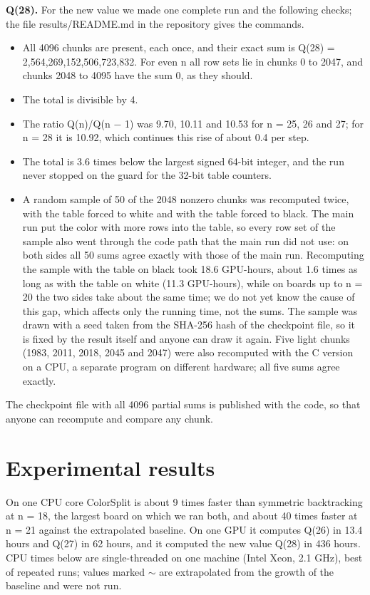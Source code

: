 \textbf{Q(28).} For the new value we made one complete run and the following checks; the file results/README.md in the repository gives the commands.

\begin{itemize}
\item{} All 4096 chunks are present, each once, and their exact sum is Q(28) = 2,564,269,152,506,723,832. For even n all row sets lie in chunks 0 to 2047, and chunks 2048 to 4095 have the sum 0, as they should.
\item{} The total is divisible by 4.
\item{} The ratio Q(n)/Q(n − 1) was 9.70, 10.11 and 10.53 for n = 25, 26 and 27; for n = 28 it is 10.92, which continues this rise of about 0.4 per step.
\item{} The total is 3.6 times below the largest signed 64-bit integer, and the run never stopped on the guard for the 32-bit table counters.
\item{} A random sample of 50 of the 2048 nonzero chunks was recomputed twice, with the table forced to white and with the table forced to black. The main run put the color with more rows into the table, so every row set of the sample also went through the code path that the main run did not use: on both sides all 50 sums agree exactly with those of the main run. Recomputing the sample with the table on black took 18.6 GPU-hours, about 1.6 times as long as with the table on white (11.3 GPU-hours), while on boards up to n = 20 the two sides take about the same time; we do not yet know the cause of this gap, which affects only the running time, not the sums. The sample was drawn with a seed taken from the SHA-256 hash of the checkpoint file, so it is fixed by the result itself and anyone can draw it again. Five light chunks (1983, 2011, 2018, 2045 and 2047) were also recomputed with the C version on a CPU, a separate program on different hardware; all five sums agree exactly.
\end{itemize}

The checkpoint file with all 4096 partial sums is published with the code, so that anyone can recompute and compare any chunk.

\section{Experimental results}

On one CPU core ColorSplit is about 9 times faster than symmetric backtracking at n = 18, the largest board on which we ran both, and about 40 times faster at n = 21 against the extrapolated baseline. On one GPU it computes Q(26) in 13.4 hours and Q(27) in 62 hours, and it computed the new value Q(28) in 436 hours. CPU times below are single-threaded on one machine (Intel Xeon, 2.1 GHz), best of repeated runs; values marked $\sim$ are extrapolated from the growth of the baseline and were not run.

